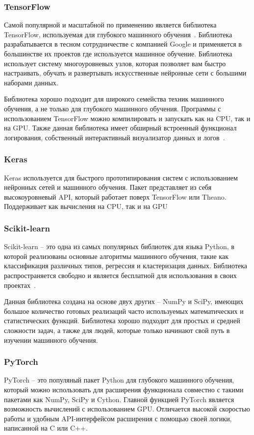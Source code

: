 \subsubsection{TensorFlow}
Самой популярной и масштабной по применению является библиотека TensorFlow, используемая для глубокого машинного обучения~\cite{gudfellow}. Библиотека разрабатывается в тесном сотрудничестве с компанией Google и применяется в большинстве их проектов где используется машинное обучение. Библиотека использует систему многоуровневых узлов, которая позволяет вам быстро настраивать, обучать и развертывать искусственные нейронные сети с большими наборами данных.
\par
Библиотека хорошо подходит для широкого семейства техник машинного обучения, а не только для глубокого машинного обучения. Программы с использованием TensorFlow можно компилировать и запускать как на CPU, так и на GPU. Также данная библиотека имеет обширный встроенный функционал логирования, собственный интерактивный визуализатор данных и логов~\cite{muller}.
\subsubsection{Keras}
Keras используется для быстрого прототипирования систем с использованием нейронных сетей и машинного обучения. Пакет представляет из себя высокоуровневый API, который работает поверх TensorFlow или Theano. Поддерживает как вычисления на CPU, так и на GPU
\subsubsection{Scikit-learn}
Scikit-learn -- это одна из самых популярных библиотек для языка Python, в которой реализованы основные алгоритмы машинного обучения, такие как классификация различных типов, регрессия и кластеризация данных. Библиотека распространяется свободно и является бесплатной для использования в своих проектах~\cite{rashka}.
\par
Данная библиотека создана на основе двух других -- NumPy и SciPy, имеющих большое количество готовых реализаций часто используемых математических и статистических функций. Библиотека хорошо подходит для простых и средней сложности задач, а также для людей, которые только начинают свой путь в изучении машинного обучения.
\subsubsection{PyTorch}
PyTorch -- это популяный пакет Python для глубокого машинного обучения, который можно использовать для расширения функционала совместно с такими пакетами как NumPy, SciPy и Cython. Главной функцией PyTorch является возможность вычислений с использованием GPU. Отличается высокой скоростью работы и удобным API-интерфейсом расширения с помощью своей логики, написанной на C или C++.
